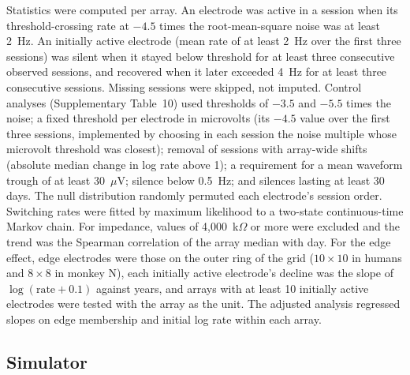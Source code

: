 \documentclass[pdflatex,sn-nature]{sn-jnl}
\begin{document}
Statistics were computed per array. An electrode was active in a session when its threshold-crossing rate at $-4.5$ times
the root-mean-square noise was at least 2~Hz. An initially active electrode (mean rate of at least 2~Hz over the first
three sessions) was silent when it stayed below threshold for at least three consecutive observed sessions, and
recovered when it later exceeded 4~Hz for at least three consecutive sessions. Missing sessions were skipped, not
imputed. Control analyses (Supplementary Table~10) used thresholds of $-3.5$ and $-5.5$ times the noise; a fixed
threshold per electrode in microvolts (its $-4.5$ value over the first three sessions, implemented by choosing in each
session the noise multiple whose microvolt threshold was closest); removal of sessions with array-wide shifts (absolute
median change in log rate above 1); a requirement for a mean waveform trough of at least 30~$\mu$V; silence below
0.5~Hz; and silences lasting at least 30 days. The null distribution randomly permuted each electrode's session order.
Switching rates were fitted by maximum likelihood to a two-state continuous-time Markov chain. For impedance, values of
4,000~k$\Omega$ or more were excluded and the trend was the Spearman correlation of the array median with day. For the
edge effect, edge electrodes were those on the outer ring of the grid ($10\times10$ in humans and $8\times8$ in monkey N),
each initially active electrode's decline was the slope of $\log(\text{rate} + 0.1)$ against years, and arrays with at
least 10 initially active electrodes were tested with the array as the unit. The adjusted analysis regressed slopes on
edge membership and initial log rate within each array.

\subsection*{Simulator}
\end{document}

